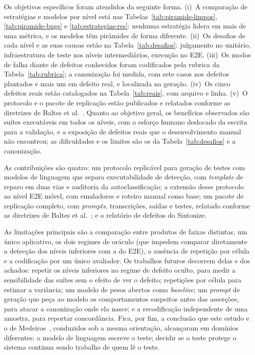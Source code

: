 \documentclass[12pt]{article}
\begin{document}
Os objetivos específicos foram atendidos da seguinte forma. (i)~A comparação
de estratégias e modelos por nível está nas
Tabelas~\ref{tab:piramide-limpos}, \ref{tab:piramide-bugs} e
\ref{tab:estrategias-res}: nenhuma estratégia lidera em mais de uma métrica,
e os modelos têm pirâmides de forma diferente. (ii)~Os desafios de cada nível
e as suas causas estão na Tabela~\ref{tab:desafios}: julgamento no unitário,
infraestrutura de teste nos níveis intermediários, execução no E2E. (iii)~Os
modos de falha diante de defeitos conhecidos foram codificados pela rubrica
da Tabela~\ref{tab:rubrica}; a canonização foi medida, com sete casos nos
defeitos plantados e mais um em defeito real, e localizada na geração.
(iv)~Os cinco defeitos reais estão catalogados na Tabela~\ref{tab:reais}, com
arquivo e linha. (v)~O protocolo e o pacote de replicação estão publicados e
relatados conforme as diretrizes de Baltes et
al.~\cite{baltes2026guidelines}. Quanto ao objetivo geral, os benefícios
observados são suítes executáveis em todos os níveis, com o esforço humano
deslocado da escrita para a validação, e a exposição de defeitos reais que o
desenvolvimento manual não encontrou; as dificuldades e os limites são os da
Tabela~\ref{tab:desafios} e a canonização.

As contribuições são quatro: um protocolo replicável para geração de testes
com modelos de linguagem que separa executabilidade de detecção, com
\textit{template} de reparo em duas vias e auditoria da autoclassificação;
a extensão desse protocolo ao nível E2E móvel, com emuladores e roteiro
manual como base; um pacote de replicação completo, com \textit{prompts},
transcrições, saídas e testes, relatado conforme as diretrizes de Baltes et
al.~\cite{baltes2026guidelines}; e o relatório de defeitos do Sintonize.

As limitações principais são a comparação entre produtos de faixas
distintas, um único aplicativo, os dois regimes de oráculo (que impedem
comparar diretamente a detecção dos níveis inferiores com a do E2E), a
ausência de repetição por célula e a codificação por um único avaliador. Os
trabalhos futuros decorrem delas e dos achados: repetir os níveis inferiores
no regime de defeito oculto, para medir a sensibilidade das suítes sem o
efeito de ver o defeito; repetições por célula para estimar a variância; um
modelo de pesos abertos como \textit{baseline}; um \textit{prompt} de geração
que peça ao modelo os comportamentos suspeitos antes das asserções, para
atacar a canonização onde ela nasce; e a recodificação independente de uma
amostra, para reportar concordância. Fica, por fim, a conclusão que este
estudo e o de Medeiros~\cite{medeiros2026acessibilidade}, conduzidos sob a
mesma orientação, alcançaram em domínios diferentes: o modelo de linguagem
escreve o teste; decidir se o teste protege o sistema continua sendo trabalho
de quem lê o teste.
\end{document}
